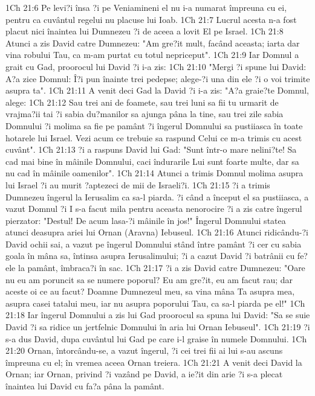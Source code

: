 1Ch 21:6  Pe levi?i însa ?i pe Veniamineni el nu i-a numarat împreuna cu ei, pentru ca cuvântul regelui nu placuse lui Ioab.
1Ch 21:7  Lucrul acesta n-a fost placut nici înaintea lui Dumnezeu ?i de aceea a lovit El pe Israel.
1Ch 21:8  Atunci a zis David catre Dumnezeu: "Am gre?it mult, facând aceasta; iarta dar vina robului Tau, ca m-am purtat cu totul nepriceput".
1Ch 21:9  Iar Domnul a grait cu Gad, proorocul lui David ?i i-a zis:
1Ch 21:10  "Mergi ?i spune lui David: A?a zice Domnul: Î?i pun înainte trei pedepse; alege-?i una din ele ?i o voi trimite asupra ta".
1Ch 21:11  A venit deci Gad la David ?i i-a zis: "A?a graie?te Domnul, alege:
1Ch 21:12  Sau trei ani de foamete, sau trei luni sa fii tu urmarit de vrajma?ii tai ?i sabia du?manilor sa ajunga pâna la tine, sau trei zile sabia Domnului ?i molima sa fie pe pamânt ?i îngerul Domnului sa pustiiasca în toate hotarele lui Israel. Vezi acum ce trebuie sa raspund Celui ce m-a trimis cu acest cuvânt".
1Ch 21:13  ?i a raspuns David lui Gad: "Sunt într-o mare nelini?te! Sa cad mai bine în mâinile Domnului, caci îndurarile Lui sunt foarte multe, dar sa nu cad în mâinile oamenilor".
1Ch 21:14  Atunci a trimis Domnul molima asupra lui Israel ?i au murit ?aptezeci de mii de Israeli?i.
1Ch 21:15  ?i a trimis Dumnezeu îngerul la Ierusalim ca sa-l piarda. ?i când a început el sa pustiiasca, a vazut Domnul ?i I s-a facut mila pentru aceasta nenorocire ?i a zis catre îngerul pierzator: "Destul! De acum lasa-?i mâinile în jos!" Îngerul Domnului statea atunci deasupra ariei lui Ornan (Aravna) Iebuseul.
1Ch 21:16  Atunci ridicându-?i David ochii sai, a vazut pe îngerul Domnului stând între pamânt ?i cer cu sabia goala în mâna sa, întinsa asupra Ierusalimului; ?i a cazut David ?i batrânii cu fe?ele la pamânt, îmbraca?i în sac.
1Ch 21:17  ?i a zis David catre Dumnezeu: "Oare nu eu am poruncit sa se numere poporul? Eu am gre?it, eu am facut rau; dar aceste oi ce au facut? Doamne Dumnezeul meu, sa vina mâna Ta asupra mea, asupra casei tatalui meu, iar nu asupra poporului Tau, ca sa-l piarda pe el!"
1Ch 21:18  Iar îngerul Domnului a zis lui Gad proorocul sa spuna lui David: "Sa se suie David ?i sa ridice un jertfelnic Domnului în aria lui Ornan Iebuseul".
1Ch 21:19  ?i s-a dus David, dupa cuvântul lui Gad pe care i-l graise în numele Domnului.
1Ch 21:20  Ornan, întorcându-se, a vazut îngerul, ?i cei trei fii ai lui s-au ascuns împreuna cu el; în vremea aceea Ornan treiera.
1Ch 21:21  A venit deci David la Ornan; iar Ornan, privind ?i vazând pe David, a ie?it din arie ?i s-a plecat înaintea lui David cu fa?a pâna la pamânt.
